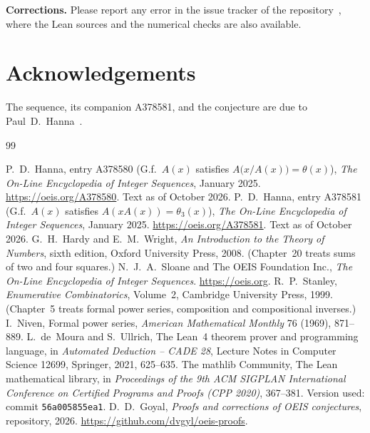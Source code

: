 \documentclass[11pt,a4paper]{article}
\theoremstyle{definition}
\theoremstyle{remark}
\newcommand{\para}[1]{\par\medskip\noindent\textbf{#1}\enspace}
\begin{document}
\para{Corrections.} Please report any error in the issue tracker of the repository~\cite{repo}, where the Lean sources and the numerical checks are also
available.

\section*{Acknowledgements}
The sequence, its companion A378581, and the conjecture are due to Paul~D.~Hanna~\cite{oeis,oeisother}.

\begin{thebibliography}{99}\small
\raggedright
{} P.~D.~Hanna, entry A378580 (G.f.\ $A(x)$ satisfies $A\bigl(x/A(x)\bigr)=\theta(x)$), \emph{The On-Line Encyclopedia of Integer Sequences}, January 2025. \url{https://oeis.org/A378580}. Text as of October 2026.
 P.~D.~Hanna, entry A378581 (G.f.\ $A(x)$ satisfies $A(xA(x))=\theta_3(x)$), \emph{The On-Line Encyclopedia of Integer Sequences}, January 2025. \url{https://oeis.org/A378581}. Text as of October 2026.
 G.~H.~Hardy and E.~M.~Wright, \emph{An Introduction to the Theory of Numbers}, sixth edition, Oxford University Press, 2008. (Chapter~20 treats sums of two and four squares.)
 N.~J.~A.~Sloane and The OEIS Foundation Inc., \emph{The On-Line Encyclopedia of Integer Sequences}. \url{https://oeis.org}.
 R.~P.~Stanley, \emph{Enumerative Combinatorics}, Volume~2, Cambridge University Press, 1999. (Chapter~5 treats formal power series, composition and compositional inverses.)
 I.~Niven, Formal power series, \emph{American Mathematical Monthly} 76 (1969), 871--889.
 L.~de~Moura and S.~Ullrich, The Lean~4 theorem prover and programming language, in \emph{Automated Deduction -- CADE 28}, Lecture Notes in Computer Science 12699, Springer, 2021, 625--635.
 The mathlib Community, The Lean mathematical library, in \emph{Proceedings of the 9th ACM SIGPLAN International Conference on Certified Programs and Proofs (CPP 2020)}, 367--381. Version used: commit \texttt{56a005855ea1}.
 D.~D.~Goyal, \emph{Proofs and corrections of OEIS conjectures}, repository, 2026. \url{https://github.com/dvgyl/oeis-proofs}.
\end{thebibliography}
\end{document}
